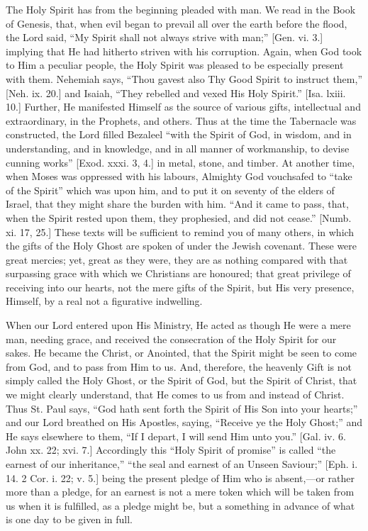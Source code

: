 The Holy Spirit has from the beginning pleaded with man. We read in
the Book of Genesis, that, when evil began to prevail all over the earth
before the flood, the Lord said, ``My Spirit shall not always strive
with man;'' [Gen. vi. 3.] implying that He had hitherto striven
with his corruption. Again, when God took to Him a peculiar people, the
Holy Spirit was pleased to be especially present with them. Nehemiah says, ``Thou gavest also
Thy Good Spirit to instruct them,'' [Neh. ix. 20.] and Isaiah,
``They rebelled and vexed His Holy Spirit.'' [Isa. lxiii. 10.]
Further, He manifested Himself as the source of various gifts,
intellectual and extraordinary, in the Prophets, and others. Thus at the
time the Tabernacle was constructed, the Lord filled Bezaleel ``with
the Spirit of God, in wisdom, and in understanding, and in knowledge,
and in all manner of workmanship, to devise cunning works'' [Exod.
xxxi. 3, 4.] in metal, stone, and timber. At another time, when Moses
was oppressed with his labours, Almighty God vouchsafed to ``take of
the Spirit'' which was upon him, and to put it on seventy of the
elders of Israel, that they might share the burden with him. ``And
it came to pass, that, when the Spirit rested upon them, they
prophesied, and did not cease.'' [Numb. xi. 17, 25.] These texts
will be sufficient to remind you of many others, in which the gifts of
the Holy Ghost are spoken of under the Jewish covenant. These were great
mercies; yet, great as they were, they are as nothing compared with that
surpassing grace with which we Christians are honoured; that great
privilege of receiving into our hearts, not the mere gifts of the
Spirit, but His very presence, Himself, by a real not a figurative
indwelling.

When our Lord entered upon His Ministry, He acted as though He were a
mere man, needing grace, and received the consecration of the Holy
Spirit for our sakes. He became the Christ, or Anointed, that the Spirit
might be seen to come from God, and to pass from Him to us. And,
therefore, the heavenly Gift is not simply called the Holy Ghost, or the
Spirit of God, but the Spirit of Christ, that we might clearly
understand, that He comes to us from and instead of Christ. Thus St.
Paul says, ``God hath sent forth the Spirit of His Son into your
hearts;'' and our Lord breathed on His Apostles, saying,
``Receive ye the Holy Ghost;'' and He says elsewhere to them,
``If I depart, I will send Him unto you.'' [Gal. iv. 6. John xx.
22; xvi. 7.] Accordingly this ``Holy Spirit of promise'' is
called ``the earnest of our inheritance,'' ``the seal and
earnest of an Unseen Saviour;'' [Eph. i. 14. 2 Cor. i. 22; v. 5.]
being the present pledge of Him who is absent,—or rather more than a
pledge, for an earnest is not a mere token which will be taken from us
when it is fulfilled, as a pledge might be, but a something in advance
of what is one day to be given in full.

